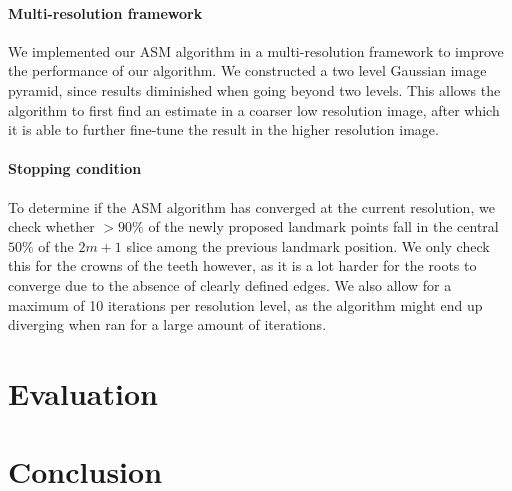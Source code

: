 \documentclass[a4paper,titlepage,12pt]{article}
\begin{document}
\paragraph{Multi-resolution framework}
We implemented our ASM algorithm in a multi-resolution framework to improve the performance of our algorithm.
We constructed a two level Gaussian image pyramid, since results diminished when going beyond two levels.
This allows the algorithm to first find an estimate in a coarser low resolution image, after which it is able to further fine-tune the result in the higher resolution image.

\paragraph{Stopping condition}

To determine if the ASM algorithm has converged at the current resolution, we check whether $>90\%$ of the newly proposed landmark points fall in the central $50\%$ of the $2m + 1$ slice among the previous landmark position.
We only check this for the crowns of the teeth however, as it is a lot harder for the roots to converge due to the absence of clearly defined edges.
We also allow for a maximum of 10 iterations per resolution level, as the algorithm might end up diverging when ran for a large amount of iterations.




\section{Evaluation}


\section{Conclusion}




\end{document}
